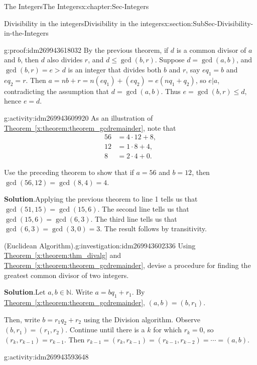 \documentclass[oneside,10pt,]{book}
\numberwithin{equation}{section}
\renewcommand{\le}{\leqslant}
\def\N{{\mathbb N}}
\newcommand{\amp}{&}
\begin{document}
\begin{chapterptx}{The Integers}{}{The Integers}{}{}{x:chapter:Sec-Integers}
\begin{sectionptx}{Divisibility in the integers}{}{Divisibility in the integers}{}{}{x:section:SubSec-Divisibility-in-the-Integers}
\begin{proofptx}{}{g:proof:idm269943618032}
By the previous theorem, if \(d\) is a common divisor of \(a\) and \(b\), then \(d\) also divides \(r\), and \(d \le \gcd(b,r)\). Suppose \(d = \gcd(a,b)\), and \(\gcd(b,r)= e > d\) is an integer that divides both \(b\) and \(r\), say \(e q_1 = b\) and \(e q_2 = r\). Then \(a = n b + r = n (e q_1) + (e q_2)= e (n q_1 + q_2)\), so \(e|a\), contradicting the assumption that \(d = \gcd(a,b)\). Thus \(e = \gcd(b,r) \le d\), hence \(e = d\).%
\end{proofptx}
\begin{activity}{}{g:activity:idm269943609920}%
As an illustration of \hyperref[x:theorem:theorem_gcdremainder]{Theorem~\ref{x:theorem:theorem_gcdremainder}}, note that%
\begin{align*}
56 \amp = 4\cdot 12 + 8,\\
12 \amp = 1\cdot 8 +4,\\
8 \amp = 2\cdot 4 + 0\text{.}
\end{align*}
%
\par
Use the preceding theorem to show that if \(a = 56\) and \(b = 12\), then \(\gcd(56, 12) = \gcd(8, 4) = 4\).%
\par\smallskip%
\noindent\textbf{Solution}.\hypertarget{g:solution:idm269943604784}{}\quad{}Applying the previous theorem to line 1 tells us that \(\gcd(51,15) = \gcd(15, 6)\). The second line tells us that \(\gcd(15,6) = \gcd(6,3)\). The third line tells us that \(\gcd(6,3) = \gcd(3,0) = 3\). The result follows by transitivity.%
\end{activity}
\begin{investigation}{(Euclidean Algorithm).}{g:investigation:idm269943602336}%
Using \hyperref[x:theorem:thm_divalg]{Theorem~\ref{x:theorem:thm_divalg}} and \hyperref[x:theorem:theorem_gcdremainder]{Theorem~\ref{x:theorem:theorem_gcdremainder}}, devise a procedure for finding the greatest common divisor of two integers.%
\par\smallskip%
\noindent\textbf{Solution}.\hypertarget{g:solution:idm269943599680}{}\quad{}Let \(a,b\in \N\). Write \(a = bq_1+r_1\). By \hyperref[x:theorem:theorem_gcdremainder]{Theorem~\ref{x:theorem:theorem_gcdremainder}}, \((a,b) = (b,r_1)\).%
\par
Then, write \(b = r_1 q_2 + r_2\) using the Division algorithm. Observe \((b,r_1) = (r_1,r_2)\). Continue until there is a \(k\) for which \(r_k = 0\), so \((r_k,r_{k-1}) = r_{k-1}\). Then \(r_{k-1}= (r_k, r_{k-1}) = (r_{k-1},r_{k-2}) = \cdots = (a,b)\).%
\end{investigation}
\begin{activity}{}{g:activity:idm269943593648}%

\end{activity}
\end{sectionptx}
\end{chapterptx}
\end{document}
